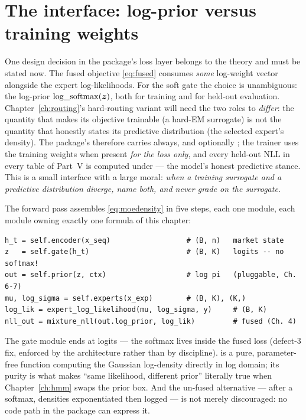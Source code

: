 \section{The interface: log-prior versus training weights}
\label{sec:interface}

One design decision in the package's loss layer belongs to the theory and
must be stated now. The fused objective \eqref{eq:fused} consumes
\emph{some} log-weight vector alongside the expert log-likelihoods. For
the soft gate the choice is unambiguous: the log-prior
$\operatorname{log\_softmax}(\bm{z})$, both for training and for held-out
evaluation. Chapter~\ref{ch:routing}'s hard-routing variant will need the
two roles to \emph{differ}: the quantity that makes its objective
trainable (a hard-EM surrogate) is not the quantity that honestly states
its predictive distribution (the selected expert's density). The
package's  therefore carries  always,
and optionally ; the trainer uses the training
weights when present \emph{for the loss only}, and every held-out NLL in
every table of Part~V is computed under  --- the model's
honest predictive stance. This is a small interface with a large moral:
\emph{when a training surrogate and a predictive distribution diverge,
name both, and never grade on the surrogate.}

\begin{codewalk}
The forward pass assembles \eqref{eq:moedensity} in five steps, each one
module, each module owning exactly one formula of this chapter:
\begin{lstlisting}
h_t = self.encoder(x_seq)                  # (B, n)   market state
z   = self.gate(h_t)                       # (B, K)   logits -- no softmax!
out = self.prior(z, ctx)                   # log pi   (pluggable, Ch. 6-7)
mu, log_sigma = self.experts(x_exp)        # (B, K), (K,)
log_lik = expert_log_likelihood(mu, log_sigma, y)     # (B, K)
nll_out = mixture_nll(out.log_prior, log_lik)         # fused (Ch. 4)
\end{lstlisting}
The gate module ends at logits --- the softmax lives inside the fused
loss (defect-3 fix, enforced by the architecture rather than by
discipline).  is a pure, parameter-free
function computing the Gaussian log-density directly in log domain; its
purity is what makes ``same likelihood, different prior'' literally true
when Chapter~\ref{ch:hmm} swaps the prior box. And the un-fused
alternative ---  after a softmax, densities
exponentiated then logged --- is not merely discouraged: no code path in
the package can express it.
\end{codewalk}

